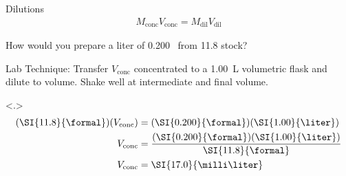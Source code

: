\documentclass[notes=show]{beamer}
\begin{document}
\begin{frame}[t]{Dilutions}
	\begin{align*}
		M_\text{conc} V_\text{conc} = M_\text{dil} V_\text{dil}
	\end{align*}

	How would you prepare a liter of \SI{0.200}{\formal}~ from
	\SI{11.8}{\formal} stock?

	\pause


	\begin{block}{Lab Technique:}
		Transfer $V_\text{conc}$ concentrated  to a
		\SI{1.00}{\liter} volumetric flask and dilute to volume. Shake
		well at intermediate and final volume.
	\end{block}

	{
	\begin{align*}
		(\SI{11.8}{\formal})(V_\text{conc}) &=
		(\SI{0.200}{\formal})(\SI{1.00}{\liter}) \\
		V_\text{conc} &=
		\dfrac{(\SI{0.200}{\formal})(\SI{1.00}{\liter})}{\SI{11.8}{\formal}} \\
		V_\text{conc} &= \SI{17.0}{\milli\liter}
	\end{align*}
	}
\end{frame}
\end{document}
